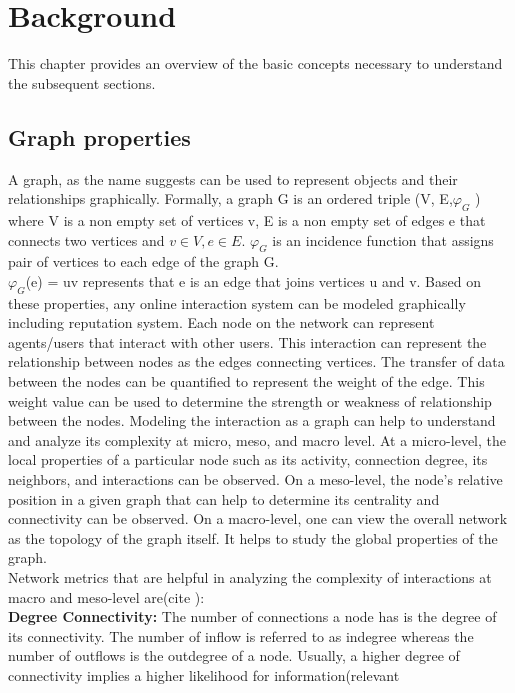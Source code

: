 \chapter{Background} \label{ch:background}
This chapter provides an overview of the basic concepts necessary to understand
the subsequent sections.

\section{Graph properties}
A graph, as the name suggests can be used to represent objects and their
relationships graphically. Formally, a graph G is an ordered triple (V,
E,$\varphi _G$ ) where V is a non empty set of vertices v, E is a non empty set
of edges e that connects two vertices and $v \in V, e \in E$. $\varphi _G$ is
an incidence function that assigns pair of vertices to each edge of the graph
G.\\ $\varphi _G $(e) = uv represents that e is an edge that joins vertices u
and v\cite{bondy1976graph}.  Based on these properties, any online interaction
system can be modeled graphically including reputation system. Each node on the
network can represent agents/users that interact with other users. This
interaction can represent the relationship between nodes as the edges
connecting vertices. The transfer of data between the nodes can be quantified
to represent the weight of the edge.  This weight value can be used to
determine the strength or weakness of relationship between the nodes.  Modeling
the interaction as a graph can help to understand and analyze its complexity at
micro, meso, and macro level\cite{gkorou2014exploiting}. At a micro-level, the
local properties of a particular node such as its activity, connection degree,
its neighbors, and interactions can be observed. On a meso-level, the node's
relative position in a given graph that can help to determine its centrality
and connectivity can be observed. On a macro-level, one can view the overall
network as the topology of the graph itself. It helps to study the global
properties of the graph.\\ 
Network metrics that are helpful in analyzing the complexity of
interactions at macro and meso-level are(cite ): \\
\textbf{Degree Connectivity:} The number of connections a node has is the
degree of its connectivity. The number of inflow is referred to as indegree
whereas the number of outflows is the outdegree of a node. Usually, a higher
degree of connectivity implies a higher likelihood for information(relevant
